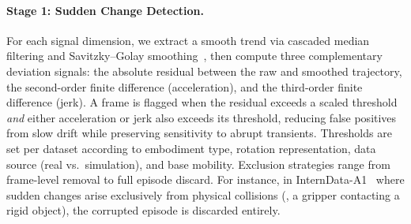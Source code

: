 \paragraph{Stage 1: Sudden Change Detection.}

For each signal dimension, we extract a smooth trend via cascaded median filtering and Savitzky--Golay smoothing~\citep{savitzky1964smoothing}, then compute three complementary deviation signals: the absolute residual between the raw and smoothed trajectory, the second-order finite difference (acceleration), and the third-order finite difference (jerk). A frame is flagged when the residual exceeds a scaled threshold \emph{and} either acceleration or jerk also exceeds its threshold, reducing false positives from slow drift while preserving sensitivity to abrupt transients. Thresholds are set per dataset according to embodiment type, rotation representation, data source (real vs.~simulation), and base mobility. Exclusion strategies range from frame-level removal to full episode discard. For instance, in InternData-A1~\citep{tian2025interndataa1} where sudden changes arise exclusively from physical collisions (\eg, a gripper contacting a rigid object), the corrupted episode is discarded entirely.


